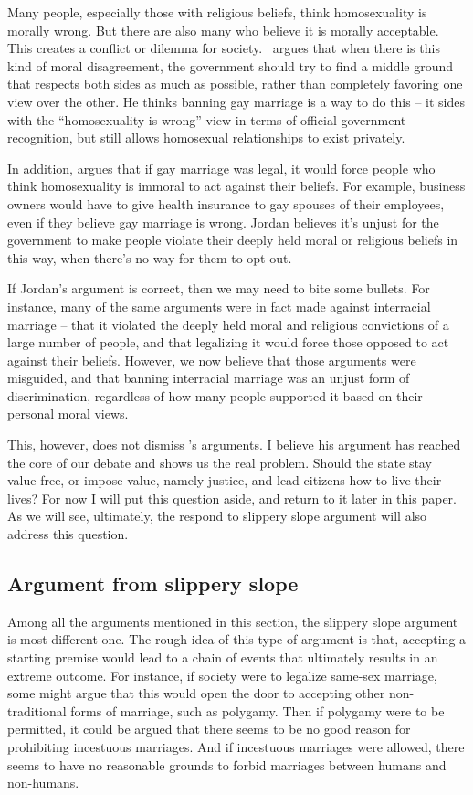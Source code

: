 \documentclass{article}
\begin{document}
Many people, especially those with religious beliefs, think homosexuality is morally wrong. But there are also many who believe it is morally acceptable. This creates a conflict or dilemma for society.~\textcite{jordanItWrongDiscriminate1995} argues that when there is this kind of moral disagreement, the government should try to find a middle ground that respects both sides as much as possible, rather than completely favoring one view over the other. He thinks banning gay marriage is a way to do this -- it sides with the ``homosexuality is wrong'' view in terms of official government recognition, but still allows homosexual relationships to exist privately. 

In addition,  argues that if gay marriage was legal, it would force people who think homosexuality is immoral to act against their beliefs. For example, business owners would have to give health insurance to gay spouses of their employees, even if they believe gay marriage is wrong. Jordan believes it's unjust for the government to make people violate their deeply held moral or religious beliefs in this way, when there's no way for them to opt out. 

If Jordan's argument is correct, then we may need to bite some bullets. For instance, many of the same arguments were in fact made against interracial marriage -- that it violated the deeply held moral and religious convictions of a large number of people, and that legalizing it would force those opposed to act against their beliefs. However, we now believe that those arguments were misguided, and that banning interracial marriage was an unjust form of discrimination, regardless of how many people supported it based on their personal moral views. 

This, however, does not dismiss 's arguments. I believe his argument has reached the core of our debate and shows us the real problem. Should the state stay value-free, or impose value, namely justice, and lead citizens how to live their lives? For now I will put this question aside, and return to it later in this paper. As we will see, ultimately, the respond to slippery slope argument will also address this question.


\subsection{Argument from slippery slope}

Among all the arguments mentioned in this section, the slippery slope argument is most different one. The rough idea of this type of argument is that, accepting a starting premise would lead to a chain of events that ultimately results in an extreme outcome. For instance, if society were to legalize same-sex marriage, some might argue that this would open the door to accepting other non-traditional forms of marriage, such as polygamy. Then if polygamy were to be permitted, it could be argued that there seems to be no good reason for prohibiting incestuous marriages. And if incestuous marriages were allowed, there seems to have no reasonable grounds to forbid marriages between humans and non-humans. 
\end{document}
